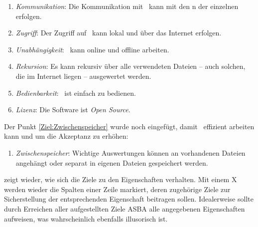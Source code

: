 \begin{enumerate}
	\item \label{Ziel:Kommunikation} \emph{Kommunikation}:
	Die Kommunikation mit \ASBA\ kann mit den n der einzelnen  erfolgen.
	\item \label{Ziel:Zugriff} \emph{Zugriff}:
	Der Zugriff auf \ASBA\ kann lokal und über das Internet erfolgen.
	\item \label{Ziel:Unabhängigkeit} \emph{Unabhängigkeit}:
	\ASBA\ kann online und offline arbeiten.
	\item \label{Ziel:Rekursion} \emph{Rekursion}:
	Es kann rekursiv über alle verwendeten Dateien -- auch solchen, die im Internet liegen -- ausgewertet werden.
	\item \label{Ziel:Bedienbarkeit} \emph{Bedienbarkeit}:
	\ASBA\ ist einfach zu bedienen.
	\item \label{Ziel:Lizenz} \emph{Lizenz}:
	Die Software ist \emph{Open Source}.
	\setcounter{Enumi}{\value{enumi}}%
\end{enumerate}
%
Der Punkt \ref{Ziel:Zwischenspeicher} wurde noch eingefügt, damit \ASBA\ effizient arbeiten kann und um die Akzeptanz zu erhöhen:
\begin{enumerate}
	\setcounter{enumi}{\value{Enumi}}%
	\item \label{Ziel:Zwischenspeicher} \emph{Zwischenspeicher}:
	Wichtige Auswertungen können an vorhandenen Dateien angehängt oder separat in eigenen Dateien gespeichert werden.
\end{enumerate}
%
 zeigt wieder, wie sich die Ziele zu den Eigenschaften  verhalten.
Mit einem X werden wieder die Spalten einer Zeile markiert, deren zugehörige Ziele zur Sicherstellung der entsprechenden Eigenschaft beitragen sollen.
Idealerweise sollte durch Erreichen aller aufgestellten Ziele \gls{ASBA} alle angegebenen Eigenschaften aufweisen, was wahrscheinlich ebenfalls illusorisch ist.
%
